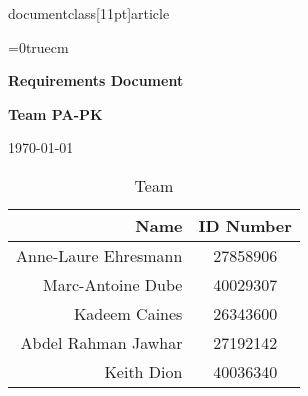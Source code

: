 documentclass[11pt]{article}
\usepackage{color}
\usepackage{enumitem}
\usepackage{booktabs}
\usepackage[pdftex]{graphicx}
\pagestyle{empty}
\setcounter{secnumdepth}{2}

\topmargin=0cm
\oddsidemargin=0cm
\textheight=22.0cm
\textwidth=17cm
\parindent=0cm
\parskip=0.15cm
\topskip=0truecm
\raggedbottom
\abovedisplayskip=3mm
\belowdisplayskip=3mm
\abovedisplayshortskip=0mm
\belowdisplayshortskip=2mm
\normalbaselineskip=12pt
\normalbaselines


\newcommand\tabularhead[1]{
\begin{table}[ht]
    \addtocounter{use case ID}{1}
    \caption{Use Case \arabic{use case ID} - #1}
    \vspace{0.2cm}
    \begin{tabular}{|p{0.2\linewidth}|p{0.70\linewidth}|}
    \hline
        \textbf{Action} & \textbf{#1} \\
        \hline}

    \newcommand\addrow[2]{#1 & #2\\ \hline}

    \newcommand\addmulrow[2]{ \begin{minipage}[t][][t]{2.5cm}#1\end{minipage}
        &\begin{minipage}[t][][t]{11cm}
        \begin{enumerate}[itemsep=-1ex] #2   \end{enumerate}
    \end{minipage}\vfill\\ \hline}

    \newenvironment{usecase}{\tabularhead}
{\hline\end{tabular}\end{table}}




\vspace*{0.5in}
\centerline{\bf\Large Requirements Document}

\vspace*{0.5in}
\centerline{\bf\Large Team PA-PK}

\vspace*{0.5in}
\centerline{\today}

\vspace*{1.5in}
\begin{table}[htbp]
\caption{Team}
\begin{center}
\begin{tabular}{|r | c|}
\hline
Name & ID Number \\
\hline\hline
Anne-Laure Ehresmann & 27858906 \\
\hline
Marc-Antoine Dube & 40029307 \\
\hline
Kadeem Caines & 26343600 \\
\hline
Abdel Rahman Jawhar & 27192142 \\
\hline
Keith Dion & 40036340 \\
\hline
\end{tabular}
\end{center}
\end{table}

